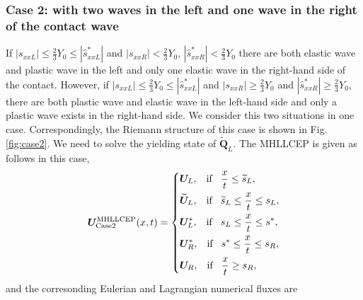 \documentclass{article}
\numberwithin{equation}{section}
\numberwithin{table}{section}
\begin{document}
 \subsubsection{Case 2:  with  two waves in the left  and one wave in the right of the contact wave}\label{sec:case2}
If  $|s_{xxL}| \le \frac{2}{3}Y_0 \le  |\hat{s}_{xxL}^*|$ and $|s_{xxR}|<\frac{2}{3}Y_0$, $|\hat{s}_{xxR}^*| < \frac{2}{3}Y_0$ there are both elastic wave and plastic wave in the left and only one elastic wave in the right-hand side of the contact.  However, if  $|s_{xxL}| \le \frac{2}{3}Y_0 \le  |\hat{s}_{xxL}^*|$ and  $|s_{xxR}|\geq \frac{2}{3}Y_0$ and $|\hat{s}_{xxR}^*| \geq \frac{2}{3}Y_0$, there are both plastic wave and elastic wave in the left-hand side and only a plastic wave exists in the right-hand side.  We consider this two situations in one case. Correspondingly, the Riemann structure of this case is shown in Fig.\ref{fig:case2}. We need to solve the yielding state of $\widetilde{\bm{Q}}_L$. The MHLLCEP is given as follows in this case,
 \begin{equation}\label{eq:HLLCEP2}
   \bm{U}^{\text{MHLLCEP}}_{\text{Case2}}(x,t) = \left\{ \begin{aligned}
	   & \bm{U}_L, \hspace{0.3cm} \text{if} \hspace{0.3cm} \frac{x}{t}\le \widetilde{s}_L, \\
		&  \widetilde{\bm{U}}_L, \hspace{0.3cm} \text{if} \hspace{0.3cm} \widetilde{s}_L\le \frac{x}{t} \le  s_L, \\
		&\bm{U}_L^*, \hspace{0.3cm} \text{if} \hspace{0.3cm} s_L\le \frac{x}{t} \le s^*, \\
		& \bm{U}_R^*, \hspace{0.3cm} \text{if} \hspace{0.3cm} s^*\le \frac{x}{t} \le s_R,\\
		& \bm{U}_R, \hspace{0.3cm} \text{if} \hspace{0.3cm} \frac{x}{t}\ge s_R, \\
	  \end{aligned}
	\right.
  \end{equation}
  and the corresonding Eulerian and Lagrangian numerical fluxes are
\end{document}
